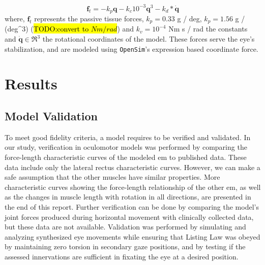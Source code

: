\documentclass[11pt,a4paper,draft=false]{report}
\renewcommand*{\vec}[1]{\bm{#1}}
\newcommand{\R}[1]{\mathfrak{R}^{#1}}
\newcommand{\inr}[1]{\in\R{#1}}
\begin{document}
\begin{equation}\label{equ:passive-tissue}
  \vec{f}_t = -k_p \vec{q} - k_c 10^{-3} \vec{q}^3 - k_d * \vec{\dot{q}}
\end{equation}
% 
where, $\vec{f}_t$ represents the passive tissue forces, $k_p= 0.33$ g / deg,
$k_p= 1.56$ g / (deg^3) (\hl{TODO:convert to $Nm / rad$}) and $k_v= 10^{-4}$ Nm
s / rad the constants and $\vec{\dot{q}} \inr{3}$ the rotational coordinates of
the model. These forces serve the eye’s stabilization, and are modeled using
\texttt{OpenSim}'s expression based coordinate force.

\section*{Results}\label{sec:results}

\subsection*{Model Validation}\label{sec:model-validation}

To meet good fidelity criteria, a model requires to be verified and
validated. In our study, verification in oculomotor models was performed by
comparing the force-length characteristic curves of the modeled \gls{em} to
published data. These data include only the lateral rectus characteristic
curves. However, we can make a safe assumption that the other muscles have
similar properties. More characteristic curves showing the force-length
relationship of the other \gls{em}, as well as the changes in muscle length with
rotation in all directions, are presented in the end of this report. Further
verification can be done by comparing the model’s joint forces produced during
horizontal movement with clinically collected data, but these data are not
available.  Validation was performed by simulating and analyzing synthesized eye
movements while ensuring that Listing Law was obeyed by maintaining zero torsion
in secondary gaze positions, and by testing if the assessed innervations are
sufficient in fixating the eye at a desired position.

\end{document}
